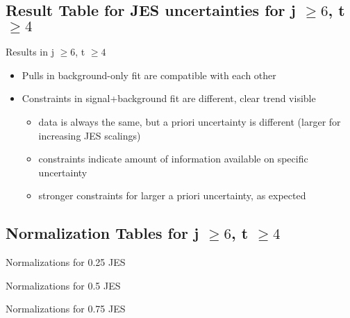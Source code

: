 \subsection{Result Table for JES uncertainties for j $\geq 6$, t $\geq 4$}
\begin{frame}{Results in j $\geq 6$, t $\geq 4$}

\begin{itemize}
\item Pulls in background-only fit are compatible with each other
\item Constraints in signal+background fit are different, clear trend visible\\
\begin{itemize}
\item data is always the same, but a priori uncertainty is different (larger for increasing JES scalings)\\
\item constraints indicate amount of information available on specific uncertainty\\
\item stronger constraints for larger a priori uncertainty, as expected
\end{itemize}
\end{itemize}
\end{frame}

\subsection{Normalization Tables for j $\geq 6$, t $\geq 4$}

\begin{frame}{Normalizations for \num[round-precision=2]{0.25} JES}
\begin{scriptsize}

\end{scriptsize}
\end{frame}

\begin{frame}{Normalizations for \num[round-precision=2]{0.5} JES}
\begin{scriptsize}

\end{scriptsize}
\end{frame}

\begin{frame}{Normalizations for \num[round-precision=2]{0.75} JES}
\begin{scriptsize}

\end{scriptsize}
\end{frame}

